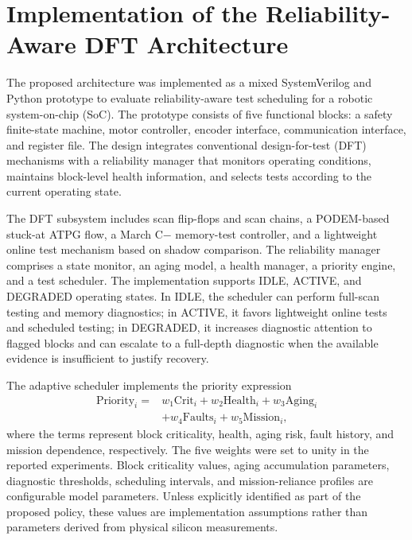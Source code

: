\documentclass[journal]{IEEEtran}
\begin{document}
\section{Implementation of the Reliability-Aware DFT Architecture}
\label{sec:impl}
The proposed architecture was implemented as a mixed SystemVerilog and Python prototype to evaluate reliability-aware test scheduling for a robotic system-on-chip (SoC). The prototype consists of five functional blocks: a safety finite-state machine, motor controller, encoder interface, communication interface, and register file. The design integrates conventional design-for-test (DFT) mechanisms with a reliability manager that monitors operating conditions, maintains block-level health information, and selects tests according to the current operating state.

The DFT subsystem includes scan flip-flops and scan chains, a PODEM-based stuck-at ATPG flow, a March C$-$ memory-test controller, and a lightweight online test mechanism based on shadow comparison. The reliability manager comprises a state monitor, an aging model, a health manager, a priority engine, and a test scheduler. The implementation supports IDLE, ACTIVE, and DEGRADED operating states. In IDLE, the scheduler can perform full-scan testing and memory diagnostics; in ACTIVE, it favors lightweight online tests and scheduled testing; in DEGRADED, it increases diagnostic attention to flagged blocks and can escalate to a full-depth diagnostic when the available evidence is insufficient to justify recovery.

The adaptive scheduler implements the priority expression
\begin{equation*}
\begin{split}\mathrm{Priority}_i={}&w_1\mathrm{Crit}_i+w_2\mathrm{Health}_i+w_3\mathrm{Aging}_i\\&+w_4\mathrm{Faults}_i+w_5\mathrm{Mission}_i,\end{split}
\end{equation*}
where the terms represent block criticality, health, aging risk, fault history, and mission dependence, respectively. The five weights were set to unity in the reported experiments. Block criticality values, aging accumulation parameters, diagnostic thresholds, scheduling intervals, and mission-reliance profiles are configurable model parameters. Unless explicitly identified as part of the proposed policy, these values are implementation assumptions rather than parameters derived from physical silicon measurements.
\end{document}
